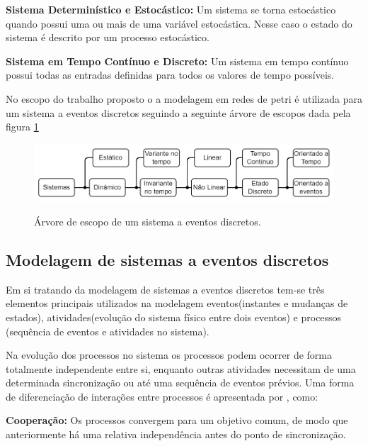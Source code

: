 \textbf{Sistema Determinístico e Estocástico: } Um sistema se torna estocástico quando possui uma ou mais de uma variável estocástica. Nesse caso o estado do sistema é descrito por um processo estocástico.

\textbf{Sistema em Tempo Contínuo e Discreto: } Um sistema em tempo contínuo possui todas as entradas definidas para todos os valores de tempo possíveis. 

No escopo do trabalho proposto o a modelagem em redes de petri é utilizada para um sistema a eventos discretos seguindo a seguinte árvore de escopos dada pela figura \ref{fig:arvore_escopo}
\begin{figure}
    \centering
    \caption{Árvore de escopo de um sistema a eventos discretos.}
    \includegraphics[scale=0.4]{figures/Petri/arvore_escopo.png}
    \label{fig:arvore_escopo}
\end{figure}

    
\subsection{Modelagem de sistemas a eventos discretos}

Em si tratando da modelagem de sistemas a eventos discretos tem-se três elementos principais utilizados na modelagem eventos(instantes e mudanças de estados), atividades(evolução do sistema físico entre dois eventos) e processos (sequência de eventos e atividades no sistema). 

Na evolução dos processos no sistema os processos podem ocorrer de forma totalmente independente entre si, enquanto outras atividades necessitam de uma determinada sincronização ou até uma sequência de eventos prévios. Uma forma de diferenciação de interações entre processos é apresentada por \cite{vallete}, como:

\textbf{Cooperação:} Os processos convergem para um objetivo comum, de modo que anteriormente há uma relativa independência antes do ponto de sincronização.

